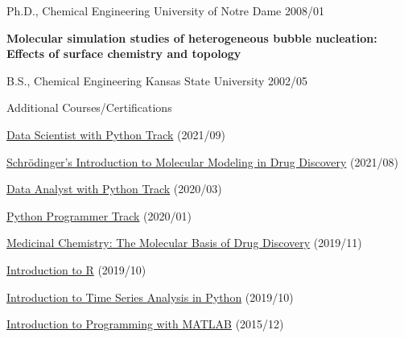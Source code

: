 
\begin{cventries}
  \cventry
    {Ph.D., Chemical Engineering} %
    {University of Notre Dame} %
    {} %
    {2008/01} %
    {
      \begin{cvitems} %
         \item {\textbf{Molecular simulation studies of heterogeneous bubble nucleation: Effects of surface chemistry and topology}}
      \end{cvitems}
    }
    
    \cventry
      {B.S., Chemical Engineering}
      {Kansas State University}
      {}
      {2002/05}
      {}

  \vspace{-10pt}
      
  \cventry
    {}
    {Additional Courses/Certifications}
    {}
    {}
    {
        \begin{cvitems}
            \item{\href{https://www.datacamp.com/statement-of-accomplishment/track/2bb866790e6f6cda38fbc31ede0fb670e8c3bd5e}{Data Scientist with Python Track} (2021/09)}            
            \item{\href{https://api.badgr.io/public/assertions/zZ7-bHnkTcm6H_UNr2s-LA}{Schrödinger's Introduction to Molecular Modeling in Drug Discovery} (2021/08)}
            \item{\href{https://www.datacamp.com/statement-of-accomplishment/track/7171f97d35d807ece49c6e38c3d945583d4ae9dd}{Data Analyst with Python Track} (2020/03)}
            \item{\href{https://www.datacamp.com/statement-of-accomplishment/track/546928503f3ccea8a2ef53a6040f43997381f967}{Python Programmer Track} (2020/01)}
            \item{\href{https://courses.edx.org/certificates/27307d91954041dab94af0ff554bc378}{Medicinal Chemistry: The Molecular Basis of Drug Discovery} (2019/11)}
            \item{\href{https://www.datacamp.com/statement-of-accomplishment/course/dd5746b9564cf374bcc0bb379e1801925e25259e}{Introduction to R} (2019/10)}
            \item {\href{https://www.datacamp.com/statement-of-accomplishment/course/807548ea866063da3c0083afcebf3be48d44f277}{Introduction to Time Series Analysis in Python} (2019/10)}
            \item {\href{https://www.coursera.org/account/accomplishments/verify/9G7V69L6QP}{Introduction to Programming with MATLAB} (2015/12)}
        \end{cvitems}      
    }

\end{cventries}
